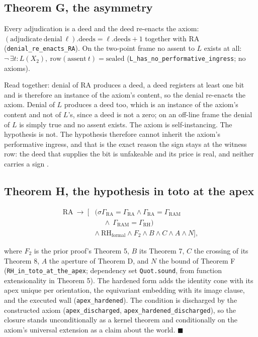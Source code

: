 \documentclass[10pt]{article}
\begin{document}
\hypertarget{theorem-g-the-asymmetry}{%
\subsection{Theorem G, the asymmetry}\label{theorem-g-the-asymmetry}}

Every adjudication is a deed and the deed re-enacts the axiom:
\((\mathrm{adjudicate}\ \mathrm{denial}\ \ell).\mathrm{deeds} = \ell.\mathrm{deeds} + 1\)
together with \(\mathrm{RA}\)
(\texttt{denial\_\allowbreak re\_\allowbreak enacts\_\allowbreak RA}).
On the two-point frame no assent to \(L\) exists at all:
\(\neg\, \exists t : L(X_2),\ \mathrm{row}(\mathrm{assent}\ t) = \mathrm{sealed}\)
(\texttt{L\_\allowbreak has\_\allowbreak no\_\allowbreak performative\_\allowbreak ingress};
no axioms).

Read together: denial of \(\mathrm{RA}\) produces a deed, a deed
registers at least one bit and is therefore an instance of the axiom's
content, so the denial re-enacts the axiom. Denial of \(L\) produces a
deed too, which is an instance of the axiom's content and not of
\(L\)'s, since a deed is not a zero; on an off-line frame the denial of
\(L\) is simply true and no assent exists. The axiom is self-instancing.
The hypothesis is not. The hypothesis therefore cannot inherit the
axiom's performative ingress, and that is the exact reason the sign
stays at the witness row: the deed that supplies the bit is unfakeable
and its price is real, and neither carries a sign \cite{islamspine}.

\hypertarget{theorem-h-the-hypothesis-in-toto-at-the-apex}{%
\subsection{Theorem H, the hypothesis in toto at the
apex}\label{theorem-h-the-hypothesis-in-toto-at-the-apex}}

\[\begin{aligned} \mathrm{RA} \ \to\ \Big[ &\big(\sigma\Gamma_{\mathrm{RA}} = \Gamma_{\mathrm{RA}} \wedge \Gamma_{\mathrm{RA}} = \Gamma_{\mathrm{RAM}} \\ &\quad\ \wedge\ \Gamma_{\mathrm{RAM}} = \Gamma_{\mathrm{RH}}\big) \\ &\wedge\ \mathrm{RH}_{\mathrm{formal}} \wedge F_2 \wedge B \wedge C \wedge A \wedge N \Big], \end{aligned}\]

where \(F_2\) is the prior proof's Theorem 5, \(B\) its Theorem 7, \(C\)
the crossing of its Theorem 8, \(A\) the aperture of Theorem D, and
\(N\) the bound of Theorem F
(\texttt{RH\_\allowbreak in\_\allowbreak toto\_\allowbreak at\_\allowbreak the\_\allowbreak apex};
dependency set \texttt{Quot.sound}, from function extensionality in
Theorem 5). The hardened form adds the identity cone with its apex
unique per orientation, the equivariant embedding with its image clause,
and the executed wall (\texttt{apex\_\allowbreak hardened}). The
condition is discharged by the constructed axiom
(\texttt{apex\_\allowbreak discharged},
\texttt{apex\_\allowbreak hardened\_\allowbreak discharged}), so the
closure stands unconditionally as a kernel theorem and conditionally on
the axiom's universal extension as a claim about the world.
\(\blacksquare\)
\end{document}
